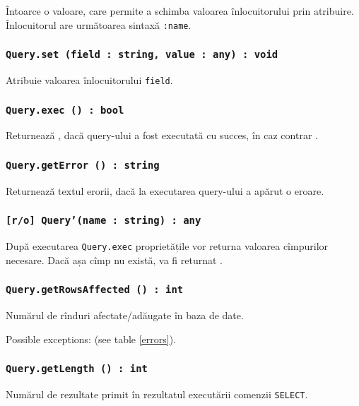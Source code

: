Întoarce o valoare, care permite a schimba valoarea înlocuitorului prin atribuire. Înlocuitorul are următoarea sintaxă \texttt{:name}.

\subsubsection{\texttt{Query.set (field : string, value : any) : void}}

Atribuie valoarea înlocuitorului \texttt{field}.

\subsubsection{\texttt{Query.exec () : bool}}

Returnează \true, dacă query-ului a fost executată cu succes, în caz contrar \false.

\subsubsection{\texttt{Query.getError () : string}}

Returnează textul erorii, dacă la executarea query-ului a apărut o eroare.

\subsubsection{\texttt{[r/o] Query'(name : string) : any}}

După executarea \texttt{Query.exec} proprietățile vor returna valoarea cîmpurilor necesare. Dacă așa cîmp nu există, va fi returnat \void.

\subsubsection{\texttt{Query.getRowsAffected () : int}}

Numărul de rînduri afectate/adăugate în baza de date.

Possible exceptions:  (see table \ref{errors}).

\subsubsection{\texttt{Query.getLength () : int}}

Numărul de rezultate primit în rezultatul executării comenzii \texttt{SELECT}.

